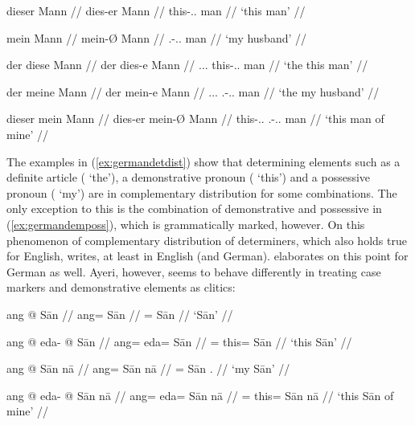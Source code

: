 	\a\begingl
		\gla dieser Mann //
		\glb dies-er Mann //
		\glc this-\Nom{}.\Sg{}.\N{} man //
		\glft `this man' //
	\endgl

	\a\begingl
		\gla mein Mann //
		\glb mein-Ø Mann //
		\glc \Fsg{}.\Gen{}-\Nom{}.\Sg{}.\N{} man //
		\glft `my husband' //
	\endgl

	\a\ljudge*\begingl
		\gla der diese Mann //
		\glb der dies-e Mann //
		\glc \Def{}.\Nom{}.\Sg{}.\M{} this-\Nom{}.\Sg{}.\N{} man //
		\glft `the this man' //
	\endgl

	\a\ljudge*\begingl
		\gla der meine Mann //
		\glb der mein-e Mann //
		\glc \Def{}.\Nom{}.\Sg{}.\M{} \Fsg{}.\Gen{}-\Nom{}.\Sg{}.\N{} man //
		\glft `the my husband' //
	\endgl

	\a\ljudge\mkd\label{ex:germandemposs}\begingl
		\gla dieser mein Mann //
		\glb dies-er mein-Ø Mann //
		\glc this-\Nom{}.\Sg{}.\N{} \Fsg{}.\Gen{}-\Nom{}.\Sg{}.\N{} man //
		\glft `this man of mine' //
	\endgl
\xe

The examples in (\ref{ex:germandetdist}) show that determining elements such as
a definite article ( `the'), a demonstrative pronoun (
`this') and a possessive pronoun ( `my') are in complementary
distribution for some combinations. The only exception to this is the
combination of demonstrative and possessive in (\ref{ex:germandemposs}), which
is grammatically marked, however. On this phenomenon of complementary
distribution of determiners, which also holds true for English, \citet[208]
{carnie2013} writes,  at
least in English (and German). \citet[9--22]{demske2001} elaborates on this
point for German as well. Ayeri, however, seems to behave differently in
treating case markers and demonstrative elements as clitics:

\pex\label{ex:ayericasenoart}
	\a
	\begingl
		\gla ang @ Sān //
		\glb ang= Sān //
		\glc \Aarg{}= Sān //
		\glft `Sān' //
	\endgl

	\a\begingl
		\gla ang @ eda- @ Sān //
		\glb ang= eda= Sān //
		\glc \Aarg{}= this= Sān //
		\glft `this Sān' //
	\endgl

	\a\label{ex:naaadj}\begingl
		\gla ang @ Sān nā //
		\glb ang= Sān nā //
		\glc \Aarg{}= Sān \Fsg{}.\Gen{} //
		\glft `my Sān' //
	\endgl

	\a\ljudge\ques\begingl
		\gla ang @ eda- @ Sān nā //
		\glb ang= eda= Sān nā //
		\glc \Aarg{}= this= Sān nā //
		\glft `this Sān of mine' //
	\endgl
\xe

